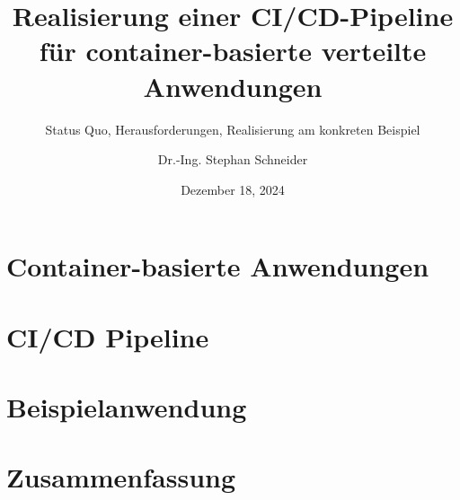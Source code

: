 \documentclass[german,aspectratio=169]{beamer}
\title[Realisierung einer CI/CD-Pipeline]{Realisierung einer CI/CD-Pipeline\\ für container-basierte verteilte Anwendungen}
\subtitle{Status Quo, Herausforderungen, Realisierung am konkreten Beispiel}
\author{Dr.-Ing. Stephan Schneider}
\date{Dezember 18, 2024}
\begin{document}
	
	
	
	\section{Container-basierte Anwendungen}
	
	
	
	
	
	\section{CI/CD Pipeline}
	
	\section{Beispielanwendung}
	
	
	
	
	\section{Zusammenfassung}
	
	
\end{document}
